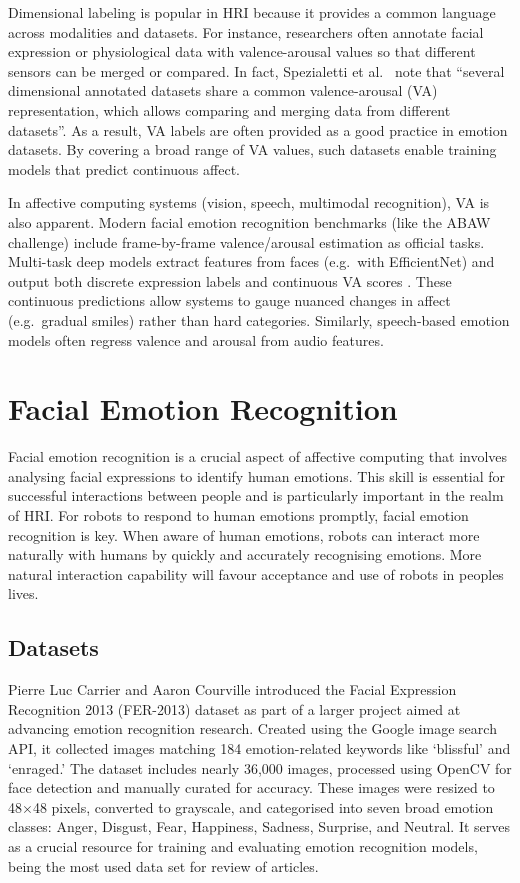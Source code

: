 Dimensional labeling is popular in HRI because it provides a common language across modalities and datasets. For instance, researchers often annotate facial expression or physiological data with valence-arousal values so that different sensors can be merged or compared. In fact, Spezialetti et al.\ \cite{Spezialetti2020-ty} note that ``several dimensional annotated datasets share a common valence-arousal (VA) representation, which allows comparing and merging data from different datasets''. As a result, VA labels are often provided as a good practice in emotion datasets. By covering a broad range of VA values, such datasets enable training models that predict continuous affect.

In affective computing systems (vision, speech, multimodal recognition), VA is also apparent. Modern facial emotion recognition benchmarks (like the ABAW challenge) include frame-by-frame valence/arousal estimation as official tasks. Multi-task deep models extract features from faces (e.g.\ with EfficientNet) and output both discrete expression labels and continuous VA scores \cite{Savchenko2024-ns}. These continuous predictions allow systems to gauge nuanced changes in affect (e.g.\ gradual smiles) rather than hard categories. Similarly, speech-based emotion models often regress valence and arousal from audio features.

\section{Facial Emotion Recognition}

Facial emotion recognition is a crucial aspect of affective computing \cite{Picard2000-mt} that involves analysing facial expressions to identify human emotions. This skill is essential for successful interactions between people and is particularly important in the realm of HRI. For robots to respond to human emotions promptly, facial emotion recognition is key. When aware of human emotions, robots can interact more naturally with humans by quickly and accurately recognising emotions. More natural interaction capability will favour acceptance and use of robots in peoples lives.

\subsection{Datasets}
Pierre Luc Carrier and Aaron Courville \cite{Goodfellow2013-al} introduced the Facial Expression Recognition 2013 (FER-2013) dataset as part of a larger project aimed at advancing emotion recognition research. Created using the Google image search API, it collected images matching 184 emotion-related keywords like `blissful' and `enraged.' The dataset includes nearly 36,000 images, processed using OpenCV for face detection and manually curated for accuracy. These images were resized to 48\(\times\)48 pixels, converted to grayscale, and categorised into seven broad emotion classes: Anger, Disgust, Fear, Happiness, Sadness, Surprise, and Neutral.  It serves as a crucial resource for training and evaluating emotion recognition models, being the most used data set for review of articles.

